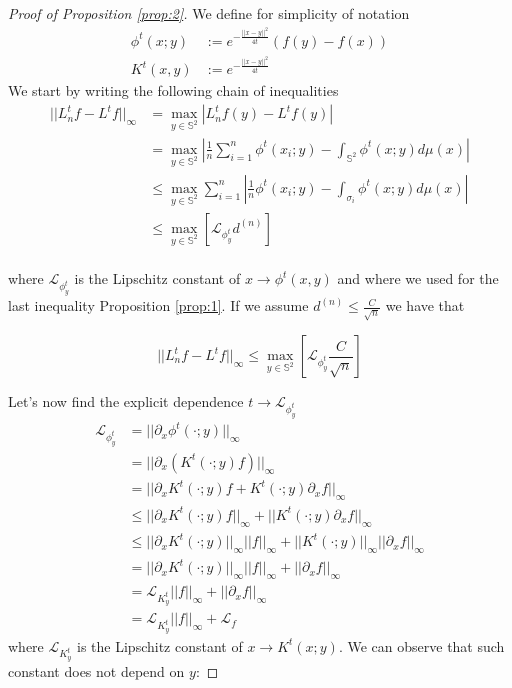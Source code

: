 \begin{proof}[Proof of Proposition \ref{prop:2}]
	
	We define for simplicity of notation
	\begin{align*}
		\phi^t(x;y) &:= e^{-\frac{||x-y||^2}{4t}}\left(f(y)-f(x)\right)\\
		K^t(x,y) &:=  e^{-\frac{||x-y||^2}{4t}}
	\end{align*}
	We start by writing the following chain of inequalities
	\begin{align*}
		||L_n^tf-L^tf||_\infty &= \max _{y\in \mathbb S^2} \left|L_n^tf(y)-L^tf(y)\right|\\
		&= \max _{y\in \mathbb S^2} \left| \frac{1}{n} \sum_{i=1}^n \phi^t(x_i; y)- \int_{\mathbb S^2} \phi^t(x;y)d\mu(x) \right|\\
		&\leq \max _{y\in \mathbb S^2}  \sum_{i=1}^n   \left| \frac{1}{n}  \phi^t(x_i; y)- \int_{\sigma_i} \phi^t(x;y)d\mu(x) \right|\\
		&\leq  \max _{y\in \mathbb S^2} \left[\mathcal L_{\phi^t_y}d^{(n)} \right]\\
	\end{align*}
	
	
	where $\mathcal L_{\phi^t_y}$ is the Lipschitz constant of $x \rightarrow \phi^t(x, y)$ and where we used for the last inequality Proposition \ref{prop:1}. If we assume $d^{(n)}\leq \frac{C}{\sqrt{n}}$ we have that
	
	$$||L_n^tf-L^tf||_\infty  \leq  \max _{y\in \mathbb S^2} \left[ \mathcal L_{\phi^t_y} \frac{C}{\sqrt{n}} \right]$$
	
	Let's now find the explicit dependence $t\rightarrow \mathcal L_{\phi^t_y}$
	\begin{align*}
		\mathcal L_{\phi^t_y} &= ||\partial_x\phi^t(\cdot;y)||_\infty\\&
		= ||\partial_x\left(K^t(\cdot;y)f\right)||_\infty\\&
		= ||\partial_x K^t(\cdot;y)f + K^t(\cdot;y)\partial_x f||_\infty\\&
		\leq ||\partial_x K^t(\cdot;y)f||_\infty + ||K^t(\cdot;y)\partial_x f||_\infty\\&
		\leq  ||\partial_x K^t(\cdot;y)||_\infty||f||_\infty + ||K^t(\cdot;y)||_\infty||\partial_x f||_\infty\\&
		= ||\partial_x K^t(\cdot;y)||_\infty||f||_\infty + ||\partial_x f||_\infty\\&
		= \mathcal L_{K^t_y} ||f||_\infty + ||\partial_xf||_\infty\\&
		= \mathcal L_{K^t_y} ||f||_\infty + \mathcal L_f
	\end{align*}
	where $\mathcal L_{K^t_y}$ is the Lipschitz constant of $x\rightarrow K^t(x;y)$. We can observe that such constant does not depend on $y$:
	

\end{proof}
